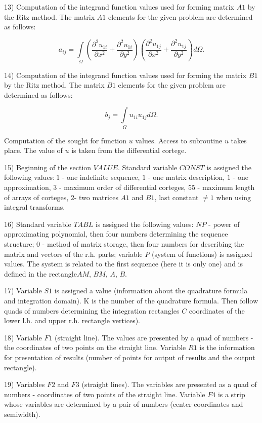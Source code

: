 13) Computation of the integrand function values used for forming matrix $A1$
by the Ritz method. The matrix $A1$ elements for the given problem are
determined as follows:

$$
a_{ij}=\int\limits_\Omega \left( \frac{\partial ^2u_{1i}}{\partial x^2}+ 
\frac{\partial ^2u_{1i}}{\partial y^2}\right) \left( \frac{\partial ^2u_{1j} 
}{\partial x^2}+\frac{\partial ^2u_{1j}}{\partial y^2}\right) d\Omega . 
$$

14) Computation of the integrand function values used for forming the matrix 
$B1$ by the Ritz method. The matrix $B1$ elements for the given problem are
determined as follows:

$$
b_j=\int\limits_\Omega u_{1i}u_{1j}d\Omega . 
$$

Computation of the sought for function $u$ values. Access to subroutine $u$
takes place. The value of $u$ is taken from the differential cortege.

15) Beginning of the section $VALUE$. Standard variable $CONST$ is assigned
the following values:$\ 1$ - one indefinite sequence, $1$ - one matrix
description, $1$ - one approximation, $3$ - maximum order of differential
corteges, $55$ - maximum length of arrays of corteges, $2$- two matrices $A1$
and $B1$, last constant $\neq 1$ when using integral transforms.

16) Standard variable $TABL$ is assigned the following values: $NP$ - power
of approximating polynomial, then four numbers determining the sequence
structure; $0$ - method of matrix storage, then four numbers for describing
the matrix and vectors of the r.h. parts; variable $P$ (system of functions)
is assigned values. The system is related to the first sequence (here it is
only one) and is defined in the rectangle$AM$, $BM$, $A$, $B$.

17) Variable $S1$ is assigned a value (information about the quadrature
formula and integration domain). K is the number of the quadrature formula.
Then follow quads of numbers determining the integration rectangles $C$
coordinates of the lower l.h. and upper r.h. rectangle vertices).

18) Variable $F1$ (straight line). The values are presented by a quad of
numbers - the coordinates of two points on the straight line. Variable $R1$
is the information for presentation of results (number of points for output
of results and the output rectangle).

19) Variables $F2$ and $F3$ (straight lines). The variables are presented as
a quad of numbers - coordinates of two points of the straight line. Variable 
$F4$ is a strip whose variables are determined by a pair of numbers (center
coordinates and semiwidth).

